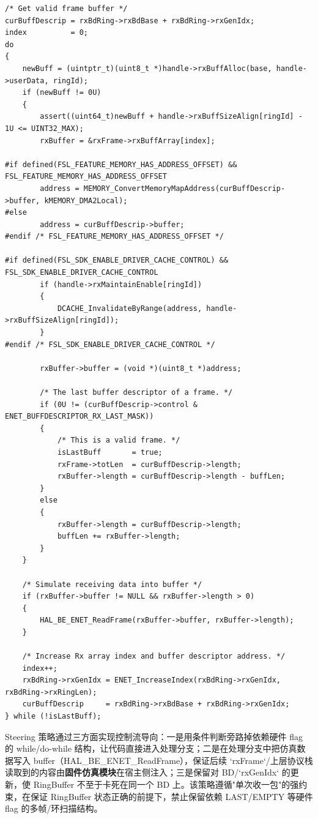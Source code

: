 \begin{lstlisting}[style=CStyle,abovecaptionskip=0pt,belowcaptionskip=0pt]
/* Get valid frame buffer */
curBuffDescrip = rxBdRing->rxBdBase + rxBdRing->rxGenIdx;
index          = 0;
do
{
    newBuff = (uintptr_t)(uint8_t *)handle->rxBuffAlloc(base, handle->userData, ringId);
    if (newBuff != 0U)
    {
        assert((uint64_t)newBuff + handle->rxBuffSizeAlign[ringId] - 1U <= UINT32_MAX);
        rxBuffer = &rxFrame->rxBuffArray[index];

#if defined(FSL_FEATURE_MEMORY_HAS_ADDRESS_OFFSET) && FSL_FEATURE_MEMORY_HAS_ADDRESS_OFFSET
        address = MEMORY_ConvertMemoryMapAddress(curBuffDescrip->buffer, kMEMORY_DMA2Local);
#else
        address = curBuffDescrip->buffer;
#endif /* FSL_FEATURE_MEMORY_HAS_ADDRESS_OFFSET */

#if defined(FSL_SDK_ENABLE_DRIVER_CACHE_CONTROL) && FSL_SDK_ENABLE_DRIVER_CACHE_CONTROL
        if (handle->rxMaintainEnable[ringId])
        {
            DCACHE_InvalidateByRange(address, handle->rxBuffSizeAlign[ringId]);
        }
#endif /* FSL_SDK_ENABLE_DRIVER_CACHE_CONTROL */

        rxBuffer->buffer = (void *)(uint8_t *)address;

        /* The last buffer descriptor of a frame. */
        if (0U != (curBuffDescrip->control & ENET_BUFFDESCRIPTOR_RX_LAST_MASK))
        {
            /* This is a valid frame. */
            isLastBuff       = true;
            rxFrame->totLen  = curBuffDescrip->length;
            rxBuffer->length = curBuffDescrip->length - buffLen;
        }
        else
        {
            rxBuffer->length = curBuffDescrip->length;
            buffLen += rxBuffer->length;
        }
    }

    /* Simulate receiving data into buffer */
    if (rxBuffer->buffer != NULL && rxBuffer->length > 0)
    {
        HAL_BE_ENET_ReadFrame(rxBuffer->buffer, rxBuffer->length);
    }

    /* Increase Rx array index and buffer descriptor address. */
    index++;
    rxBdRing->rxGenIdx = ENET_IncreaseIndex(rxBdRing->rxGenIdx, rxBdRing->rxRingLen);
    curBuffDescrip     = rxBdRing->rxBdBase + rxBdRing->rxGenIdx;
} while (!isLastBuff);
\end{lstlisting}

Steering 策略通过三方面实现控制流导向：一是用条件判断旁路掉依赖硬件 flag 的 while/do-while 结构，让代码直接进入处理分支；二是在处理分支中把仿真数据写入 buffer（HAL\_BE\_ENET\_ReadFrame），保证后续 `rxFrame`/上层协议栈读取到的内容由\textbf{固件仿真模块}在宿主侧注入；三是保留对 BD/`rxGenIdx` 的更新，使 RingBuffer 不至于卡死在同一个 BD 上。该策略遵循"单次收一包"的强约束，在保证 RingBuffer 状态正确的前提下，禁止保留依赖 LAST/EMPTY 等硬件 flag 的多帧/环扫描结构。

